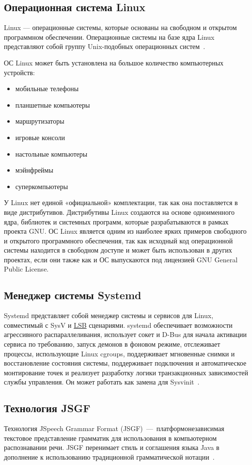 \subsection{Операционная система Linux}
Linux –-- операционные системы, которые основаны на свободном и открытом
программном обеспечении. Операционные системы на базе ядра Linux представляют
собой группу Unix-подобных операционных систем~\cite{linux}.

ОС Linux может быть установлена на большое количество компьютерных устройств:
\begin{itemize}
    \item мобильные телефоны
    \item планшетные компьютеры
    \item маршрутизаторы
    \item игровые консоли
    \item настольные компьютеры
    \item мэйнфреймы
    \item суперкомпьютеры
\end{itemize}

У Linux нет единой «официальной» комплектации, так как она поставляется в виде
дистрибутивов. Дистрибутивы Linux создаются на основе одноименного ядра,
библиотек и системных программ, которые разрабатываются в рамках проекта GNU.
ОС Linux является одним из наиболее ярких примеров свободного и открытого
программного обеспечения, так как исходный код операционной системы находится в
свободном доступе и может быть использован в других проектах, если они также как
и ОС выпускаются под лицензией GNU General Public License.

\subsection{Менеджер системы Systemd}
Systemd представляет собой менеджер системы и сервисов для Linux, совместимый с
SysV и \hyperlink{lsb}{LSB} сценариями. systemd обеспечивает возможности агрессивного
распараллеливания, использует сокет и D-Bus для начала активации сервиса по
требованию, запуск демонов в фоновом режиме, отслеживает процессы, использующие
Linux cgroups, поддерживает мгновенные снимки и восстановление состояния системы,
поддерживает подключения и автоматическое монтирование точек и реализует разработку
логики транзакционных зависимостей службы управления. Он может работать как
замена для Sysvinit~\cite{systemd}.

\subsection{Технология JSGF}
Технология JSpeech Grammar Format (JSGF)~---~платформонезависимая текстовое
представление грамматик для использования в компьютерном распознавании речи.
JSGF перенимает стиль и соглашения языка Java в дополнение к использованию
традиционной грамматической нотации~\cite{jsgf}.

